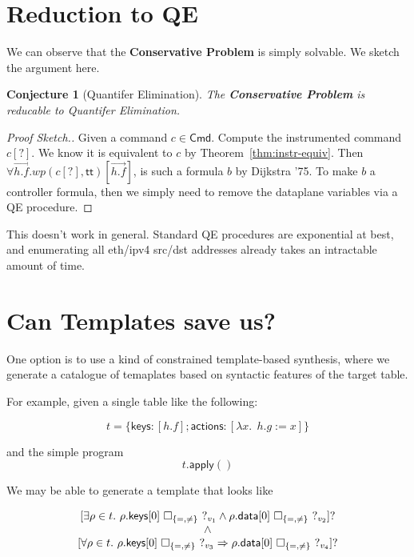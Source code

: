 \documentclass{article}
\newcommand{\TRUE}{\mathsf{tt}}
\newcommand{\Cmd}{\mathsf{Cmd}}
\newcommand{\actions}{\mathsf{actions}}
\newcommand{\keys}{\mathsf{keys}}
\newcommand{\data}{\mathsf{data}}
\newcommand{\apply}{\mathsf{apply}}
\newcommand{\WP}{\textit{wp}}
\newtheorem{conjecture}{Conjecture}
\begin{document}
\section{Reduction to QE}

We can observe that the \textbf{Conservative Problem} is simply solvable. We
sketch the argument here.

\begin{conjecture}[Quantifer Elimination]
  The \textbf{\textrm{Conservative Problem}} is reducable to Quantifer Elimination.
\end{conjecture}

\begin{proof}[Proof Sketch.]
  Given a command $c \in \Cmd$. Compute the instrumented command $c[?]$. We know
  it is equivalent to $c$ by Theorem~\ref{thm:instr-equiv}. Then $\forall
  \overrightarrow{h.f}.\WP(c[?],\TRUE)[\overrightarrow{h.f}]$, is such a
  formula $b$ by Dijkstra '75. To make $b$ a controller formula, then we simply
  need to remove the dataplane variables via a QE procedure.
\end{proof}

This doesn't work in general. Standard QE procedures are exponential at best, and
enumerating all eth/ipv4 src/dst addresses already takes an intractable amount
of time.

\section{Can Templates save us?}

One option is to use a kind of constrained template-based synthesis, where we
generate a catalogue of temaplates based on syntactic features of the target table.

For example, given a single table like the following:

\[t = \{\keys: [h.f]; \actions: [\lambda x.~~h.g:= x]\}\]

and the simple program \[t.\apply()\]

We may be able to generate a template that looks like

\[\begin{array}{>{\displaystyle}c}
  {[\exists \rho \in t.~ \rho.\keys[0]~\square_{\{=,\neq\}}~?_{v_1}\wedge \rho.\data[0]~\square_{\{=,\neq\}}~?_{v_2} ]?} \\
  \wedge\\
  {[\forall \rho \in t.~\rho.\keys[0]~\square_{\{=,\neq\}}~?_{v_3} \Rightarrow \rho.\data[0]~\square_{\{=,\neq\}}~?_{v_4}]?}
\end{array}\]
\end{document}
